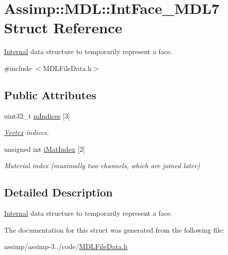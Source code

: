 \hypertarget{struct_assimp_1_1_m_d_l_1_1_int_face___m_d_l7}{\section{Assimp\+:\+:M\+D\+L\+:\+:Int\+Face\+\_\+\+M\+D\+L7 Struct Reference}
\label{struct_assimp_1_1_m_d_l_1_1_int_face___m_d_l7}
}


\hyperlink{struct_internal}{Internal} data structure to temporarily represent a face.  




{\ttfamily \#include $<$M\+D\+L\+File\+Data.\+h$>$}

\subsection*{Public Attributes}
\begin{DoxyCompactItemize}
\item 
\hypertarget{struct_assimp_1_1_m_d_l_1_1_int_face___m_d_l7_a5013e5eee5631d649dd4386fb4f20231}{uint32\+\_\+t \hyperlink{struct_assimp_1_1_m_d_l_1_1_int_face___m_d_l7_a5013e5eee5631d649dd4386fb4f20231}{m\+Indices} \mbox{[}3\mbox{]}}\label{struct_assimp_1_1_m_d_l_1_1_int_face___m_d_l7_a5013e5eee5631d649dd4386fb4f20231}

\begin{DoxyCompactList}\small\item\em \hyperlink{struct_assimp_1_1_m_d_l_1_1_vertex}{Vertex} indices. \end{DoxyCompactList}\item 
\hypertarget{struct_assimp_1_1_m_d_l_1_1_int_face___m_d_l7_ae1f6d396b7fba2070fdddda50623c031}{unsigned int \hyperlink{struct_assimp_1_1_m_d_l_1_1_int_face___m_d_l7_ae1f6d396b7fba2070fdddda50623c031}{i\+Mat\+Index} \mbox{[}2\mbox{]}}\label{struct_assimp_1_1_m_d_l_1_1_int_face___m_d_l7_ae1f6d396b7fba2070fdddda50623c031}

\begin{DoxyCompactList}\small\item\em Material index (maximally two channels, which are joined later) \end{DoxyCompactList}\end{DoxyCompactItemize}


\subsection{Detailed Description}
\hyperlink{struct_internal}{Internal} data structure to temporarily represent a face. 

The documentation for this struct was generated from the following file\+:\begin{DoxyCompactItemize}
\item 
assimp/assimp-\/3../code/\hyperlink{_m_d_l_file_data_8h}{M\+D\+L\+File\+Data.\+h}\end{DoxyCompactItemize}
